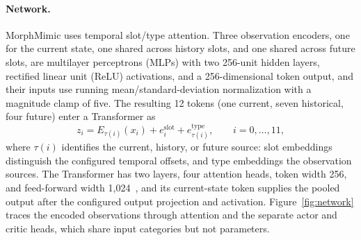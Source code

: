 \paragraph{Network.}
MorphMimic uses temporal slot/type attention. Three observation encoders, one
for the current state, one shared across history slots, and one shared across
future slots, are multilayer perceptrons (MLPs) with two 256-unit hidden layers,
rectified linear unit (ReLU) activations, and a 256-dimensional token output, and their inputs use running mean/standard-deviation
normalization with a magnitude clamp of five. The resulting 12 tokens (one
current, seven historical, four future) enter a Transformer as
\begin{equation}
    z_i = E_{\tau(i)}(x_i)
        + e_i^{\mathrm{slot}} + e_{\tau(i)}^{\mathrm{type}},
    \qquad i=0,\ldots,11,
    \label{eq:token_embedding}
\end{equation}
where $\tau(i)$ identifies the current, history, or future source: slot
embeddings distinguish the configured temporal offsets, and type embeddings the
observation sources. The Transformer has two layers, four attention heads, token
width 256, and feed-forward width 1,024~\cite{attention}, and its current-state
token supplies the pooled output after the configured output projection and
activation. Figure~\ref{fig:network} traces the encoded observations through
attention and the separate actor and critic heads, which share input categories
but not parameters.

